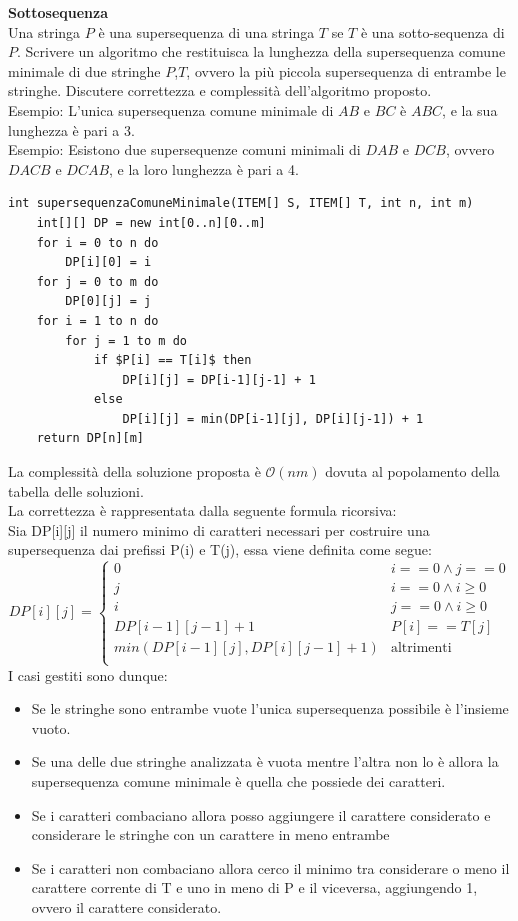 \documentclass[../cheatSheetAlgoritmi.tex]{subfiles}
\begin{document}
\textbf{Sottosequenza}\\
Una stringa $P$ è una supersequenza di una stringa $T$ se $T$ è una sotto-sequenza di $P$. Scrivere un algoritmo che restituisca la lunghezza della supersequenza comune minimale di due stringhe $P$,$T$, ovvero la più piccola supersequenza di entrambe le stringhe. Discutere correttezza e complessità dell'algoritmo proposto.\\
Esempio: L'unica supersequenza comune minimale di $AB$ e $BC$ è $ABC$, e la sua lunghezza è pari a 3.\\
Esempio: Esistono due supersequenze comuni minimali di $DAB$ e $DCB$, ovvero $DACB$ e $DCAB$, e la loro lunghezza è pari a 4.
\begin{lstlisting}[caption=Supersequenza comune minimale]
int supersequenzaComuneMinimale(ITEM[] S, ITEM[] T, int n, int m) 
    int[][] DP = new int[0..n][0..m]
    for i = 0 to n do
        DP[i][0] = i
    for j = 0 to m do
        DP[0][j] = j
    for i = 1 to n do
        for j = 1 to m do 
            if $P[i] == T[i]$ then 
                DP[i][j] = DP[i-1][j-1] + 1
            else
                DP[i][j] = min(DP[i-1][j], DP[i][j-1]) + 1
    return DP[n][m]
\end{lstlisting}
La complessità della soluzione proposta è $\mathcal{O}(nm)$ dovuta al popolamento della tabella delle soluzioni. \\
La correttezza è rappresentata dalla seguente formula ricorsiva: \\
Sia DP[i][j] il numero minimo di caratteri necessari per costruire una supersequenza dai prefissi P(i) e T(j), essa viene definita come segue: \\
\begin{equation*}
    DP[i][j]=\begin{cases}
        0 & \text{$i == 0 \land j == 0$} \\
        j & \text{$i == 0 \land i \geq 0$} \\
        i & \text{$j == 0 \land i \geq 0$} \\
        DP[i-1][j-1] + 1 & \text{$P[i] == T[j]$} \\
        min(DP[i-1][j], DP[i][j-1] + 1) & \text{altrimenti} \\
    \end{cases}
\end{equation*}
I casi gestiti sono dunque: \\
\begin{itemize}
    \item Se le stringhe sono entrambe vuote l'unica supersequenza possibile è l'insieme vuoto.
    \item Se una delle due stringhe analizzata è vuota mentre l'altra non lo è allora la supersequenza comune minimale è quella che possiede dei caratteri. 
    \item Se i caratteri combaciano allora posso aggiungere il carattere considerato e considerare le stringhe con un carattere in meno entrambe
    \item Se i caratteri non combaciano allora cerco il minimo tra considerare o meno il carattere corrente di T e uno in meno di P e il viceversa, aggiungendo 1, ovvero il carattere considerato.
\end{itemize}
\end{document}

